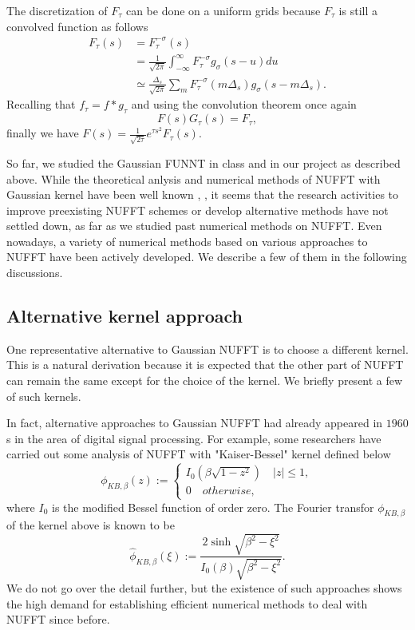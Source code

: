 The discretization of $F_{\tau}$ can be done on a uniform grids because $F_{\tau}$ is still a convolved function as follows
\begin{align}
     F_{\tau}(s)
  &= F_{\tau}^{-\sigma}(s) \\
  &= \frac{1}{\sqrt{2\pi}}\int_{-\infty}^{\infty}F_{\tau}^{-\sigma}g_{\sigma}(s-u)du \\
  &\simeq \frac{\Delta_{s}}{\sqrt{2\pi}}\sum_{m}^{}F_{\tau}^{-\sigma}(m\Delta_{s})
          g_{\sigma}(s - m\Delta_{s}).
\end{align}
Recalling that $f_{\tau} = f\ast g_{\tau}$ and using the convolution theorem once again
\begin{equation}
  F(s)G_{\tau}(s) = F_{\tau},
\end{equation}
finally we have $F(s) = \frac{1}{\sqrt{2\tau}}e^{\tau s^2}F_{\tau}(s)$.

So far, we studied the Gaussian FUNNT in class and in our project as described above.
While the theoretical anlysis and numerical methods of NUFFT with Gaussian kernel have been well known \cite{SISC-1993-Dutt-Rokhlin}, \cite{SIAM-Rev-2004-Greengard}, it seems that the research activities to improve preexisting NUFFT schemes or develop alternative methods have not settled down, as far as we studied past numerical methods on NUFFT.
Even nowadays, a variety of numerical methods based on various approaches to NUFFT have been actively developed.
We describe a few of them in the following discussions.

\subsection{Alternative kernel approach}
One representative alternative to Gaussian NUFFT is to choose a different kernel.
This is a natural derivation because it is expected that the other part of NUFFT can remain the same except for the choice of the kernel.
We briefly present a few of such kernels.

In fact, alternative approaches to Gaussian NUFFT had already appeared in $1960$s in the area of digital signal processing.
For example, some researchers have carried out some analysis of NUFFT with "Kaiser-Bessel" kernel \cite{Book-Kaiser} defined below
\begin{equation}
  \phi_{KB,\beta}(z) :=
  \begin{cases}
    I_{0}\left(\beta\sqrt{1-z^2}\right) \quad |z| \le 1,\\
    0 \quad otherwise,
  \end{cases}
  \label{eq:KB-kernel}
\end{equation}
where $I_{0}$ is the modified Bessel function of order zero.
The Fourier transfor $\phi_{KB,\beta}$ of the kernel above is known to be
\begin{equation}
  \hat{\phi}_{KB,\beta}(\xi) :=
  \frac{2\sinh\sqrt{\beta^2-\xi^2}}{I_{0}(\beta)\sqrt{\beta^2-\xi^2}}.
  \label{eq:FT-KB-kernel}
\end{equation}
We do not go over the detail further, but the existence of such approaches shows the high demand for establishing efficient numerical methods to deal with NUFFT since before.

